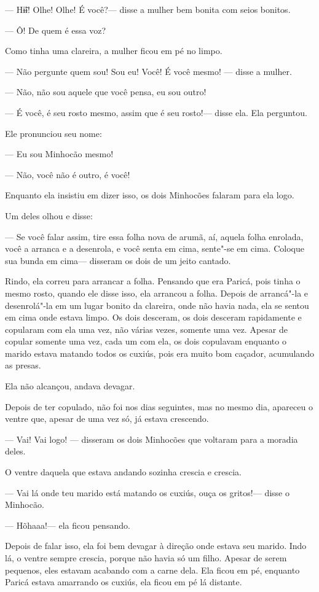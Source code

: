 --- Hɨ̃ɨ! Olhe! Olhe! É você?--- disse a mulher bem bonita com seios
bonitos.

--- Ô! De quem é essa voz?

Como tinha uma clareira, a mulher ficou em pé no limpo. 

--- Não pergunte quem sou! Sou eu! Você! É você mesmo! --- disse a
mulher.

--- Não, não sou aquele que você pensa, eu sou outro! 

--- É você, é seu rosto mesmo, assim que é seu rosto!--- disse ela. Ela
perguntou. 

Ele pronunciou seu nome: 

--- Eu sou Minhocão mesmo!

--- Não, você não é outro, é você! 

Enquanto ela insistiu em dizer isso, os dois Minhocões falaram para ela
logo. 

Um deles olhou e disse: 

--- Se você falar assim, tire essa folha nova de arumã, aí, aquela folha
enrolada, você a arranca e a desenrola, e você senta em cima, sente"-se
em cima. Coloque sua bunda em cima--- disseram os dois de um jeito
cantado. 

Rindo, ela correu para arrancar a folha. Pensando que era Paricá, pois
tinha o mesmo rosto, quando ele disse isso, ela arrancou a folha. Depois
de arrancá"-la e desenrolá"-la em um lugar bonito da clareira, onde não
havia nada, ela se sentou em cima onde estava limpo. Os dois desceram,
os dois desceram rapidamente e copularam com ela uma vez, não várias
vezes, somente uma vez. Apesar de copular somente uma vez, cada um com
ela, os dois copulavam enquanto o marido estava matando todos os cuxiús,
pois era muito bom caçador, acumulando as presas. 

Ela não alcançou, andava devagar. 

Depois de ter copulado, não foi nos dias seguintes, mas no mesmo dia,
apareceu o ventre que, apesar de uma vez só, já estava crescendo. 

--- Vai! Vai logo! --- disseram os dois Minhocões que voltaram para a
moradia deles. 

O ventre daquela que estava andando sozinha crescia e crescia. 

--- Vai lá onde teu marido está matando os cuxiús, ouça os gritos!---
disse o Minhocão. 

--- Hõhaaa!--- ela ficou pensando. 

Depois de falar isso, ela foi bem devagar à direção onde estava seu
marido. Indo lá, o ventre sempre crescia, porque não havia só um filho.
Apesar de serem pequenos, eles estavam acabando com a carne dela. Ela
ficou em pé, enquanto Paricá estava amarrando os cuxiús, ela ficou em pé
lá distante. 

